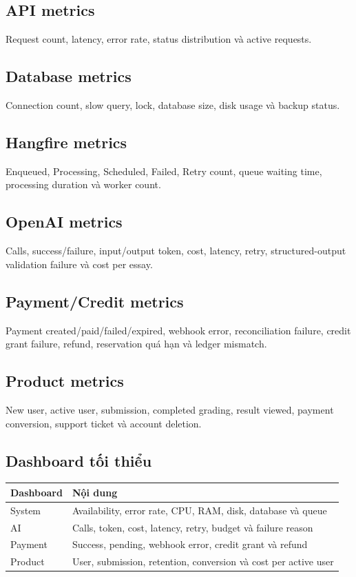 \documentclass[11pt,a4paper]{article}
\begin{document}
\subsection{API metrics}

Request count, latency, error rate, status distribution và active requests.

\subsection{Database metrics}

Connection count, slow query, lock, database size, disk usage và backup status.

\subsection{Hangfire metrics}

Enqueued, Processing, Scheduled, Failed, Retry count, queue waiting time, processing duration và worker count.

\subsection{OpenAI metrics}

Calls, success/failure, input/output token, cost, latency, retry, structured-output validation failure và cost per essay.

\subsection{Payment/Credit metrics}

Payment created/paid/failed/expired, webhook error, reconciliation failure, credit grant failure, refund, reservation quá hạn và ledger mismatch.

\subsection{Product metrics}

New user, active user, submission, completed grading, result viewed, payment conversion, support ticket và account deletion.

\subsection{Dashboard tối thiểu}

\begin{longtable}{L{0.24\textwidth}L{0.68\textwidth}}
\toprule
\textbf{Dashboard} & \textbf{Nội dung} \\
\midrule
System & Availability, error rate, CPU, RAM, disk, database và queue \\
AI & Calls, token, cost, latency, retry, budget và failure reason \\
Payment & Success, pending, webhook error, credit grant và refund \\
Product & User, submission, retention, conversion và cost per active user \\
\bottomrule
\end{longtable}
\end{document}
